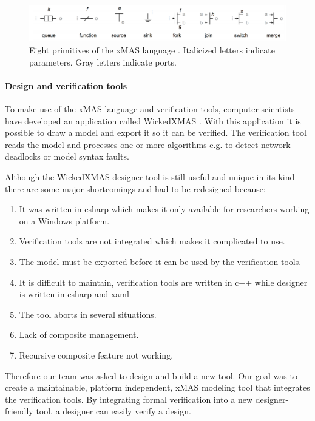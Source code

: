 \begin{figure}[here]
\includegraphics[width=1.0\textwidth]{xmas-language}
\caption{Eight primitives of the xMAS language \cite{6225465}. Italicized letters indicate
parameters. Gray letters indicate ports.}
\label{fig:xmas-language}
\end{figure}

\paragraph{Design and verification tools}

To make use of the xMAS language and verification tools, computer scientists
have developed an application called WickedXMAS \cite{WickedXmas}.
With this application it is possible to draw a model and export it so it can be
verified. The verification tool reads the model and processes one or more
algorithms e.g. to detect network deadlocks or model syntax faults.

Although the WickedXMAS designer tool is still useful and unique in its kind
there are some major shortcomings and had to be redesigned because:
\begin{enumerate}
\item It was written in csharp which makes it only available for researchers
working on a Windows platform.
\item Verification tools are not integrated which
makes it complicated to use.
\item The model must be exported before it can be
used by the verification tools.
\item It is difficult to maintain, verification tools are written in c++ while
designer is written in csharp and xaml
\item The tool aborts in several situations.
\item Lack of composite management.
\item Recursive composite feature not working.
\end{enumerate}

Therefore our team was asked to design and build a new tool. Our goal was to
create a maintainable, platform independent, xMAS modeling tool that integrates
the verification tools.
By integrating formal verification into a new designer-friendly tool, a designer
can easily verify a design.

